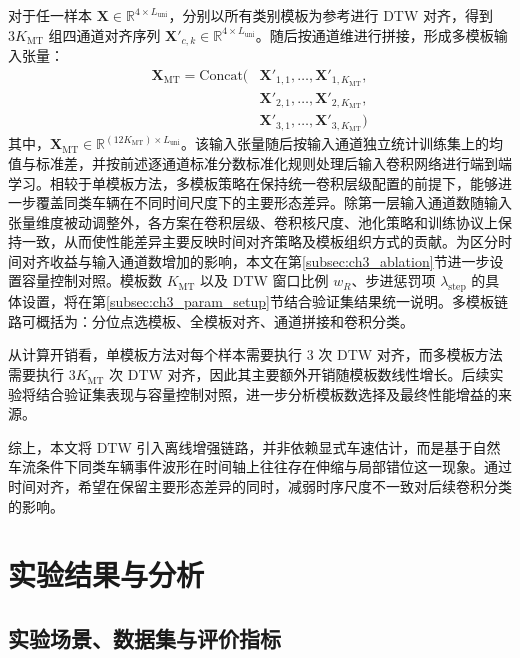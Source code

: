 \documentclass{xdupgthesis}
\begin{document}
对于任一样本 $\mathbf{X}\in\mathbb{R}^{4\times L_{\mathrm{uni}}}$，分别以所有类别模板为参考进行 DTW 对齐，得到 $3K_{\mathrm{MT}}$ 组四通道对齐序列 $\mathbf{X}'_{c,k}\in\mathbb{R}^{4\times L_{\mathrm{uni}}}$。随后按通道维进行拼接，形成多模板输入张量：
\begin{equation}
    \begin{aligned}
    \mathbf{X}_{\mathrm{MT}}=\mathrm{Concat}\big(
    &\mathbf{X}'_{1,1},\ldots,\mathbf{X}'_{1,K_{\mathrm{MT}}},\\
    &\mathbf{X}'_{2,1},\ldots,\mathbf{X}'_{2,K_{\mathrm{MT}}},\\
    &\mathbf{X}'_{3,1},\ldots,\mathbf{X}'_{3,K_{\mathrm{MT}}}
    \big)
    \end{aligned}
\end{equation}
其中，$\mathbf{X}_{\mathrm{MT}}\in\mathbb{R}^{(12K_{\mathrm{MT}})\times L_{\mathrm{uni}}}$。该输入张量随后按输入通道独立统计训练集上的均值与标准差，并按前述逐通道标准分数标准化规则处理后输入卷积网络进行端到端学习。相较于单模板方法，多模板策略在保持统一卷积层级配置的前提下，能够进一步覆盖同类车辆在不同时间尺度下的主要形态差异。除第一层输入通道数随输入张量维度被动调整外，各方案在卷积层级、卷积核尺度、池化策略和训练协议上保持一致，从而使性能差异主要反映时间对齐策略及模板组织方式的贡献。为区分时间对齐收益与输入通道数增加的影响，本文在第\ref{subsec:ch3_ablation}节进一步设置容量控制对照。模板数 $K_{\mathrm{MT}}$ 以及 DTW 窗口比例 $w_R$、步进惩罚项 $\lambda_{\mathrm{step}}$ 的具体设置，将在第\ref{subsec:ch3_param_setup}节结合验证集结果统一说明。多模板链路可概括为：分位点选模板、全模板对齐、通道拼接和卷积分类。

从计算开销看，单模板方法对每个样本需要执行 3 次 DTW 对齐，而多模板方法需要执行 $3K_{\mathrm{MT}}$ 次 DTW 对齐，因此其主要额外开销随模板数线性增长。后续实验将结合验证集表现与容量控制对照，进一步分析模板数选择及最终性能增益的来源。

综上，本文将 DTW 引入离线增强链路，并非依赖显式车速估计，而是基于自然车流条件下同类车辆事件波形在时间轴上往往存在伸缩与局部错位这一现象。通过时间对齐，希望在保留主要形态差异的同时，减弱时序尺度不一致对后续卷积分类的影响。


\section{实验结果与分析}
\label{sec:ch3_exp}

\subsection{实验场景、数据集与评价指标}
\label{subsec:ch3_dataset_eval}
\end{document}
